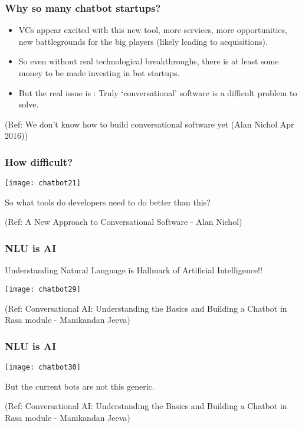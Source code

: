  \begin{frame}[fragile]\frametitle{Why so many chatbot startups?}
\begin{itemize}
\item VCs appear excited with this new tool, more services, more opportunities, new battlegrounds for the big players (likely leading to acquisitions). 
\item So even without real technological breakthroughs, there is at least some money to be made investing in bot startups.
\item But the real issue is : Truly `conversational' software is a difficult problem to solve.
\end{itemize}

{\tiny (Ref: We don't know how to build conversational software yet (Alan Nichol Apr 2016))}
\end{frame}

 \begin{frame}[fragile]\frametitle{How difficult?}

\begin{center}
\texttt{[image: chatbot21]}

\end{center}

So what tools do developers need to do better than this?


{\tiny (Ref: A New Approach to Conversational Software - Alan Nichol)}
\end{frame}

\begin{frame}[fragile]\frametitle{NLU is AI}

Understanding Natural Language is Hallmark of Artificial Intelligence!!

\begin{center}
\texttt{[image: chatbot29]}
\end{center}

{\tiny (Ref: Conversational AI: Understanding the Basics and Building a Chatbot in Rasa module - Manikandan Jeeva)}
\end{frame}

\begin{frame}[fragile]\frametitle{NLU is AI}

\begin{center}
\texttt{[image: chatbot30]}
\end{center}

But the current bots are not this generic.

{\tiny (Ref: Conversational AI: Understanding the Basics and Building a Chatbot in Rasa module - Manikandan Jeeva)}
\end{frame}


